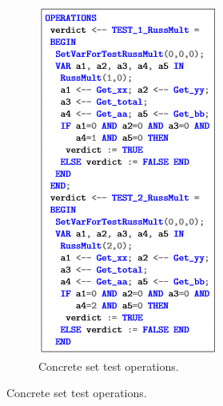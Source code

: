 \documentclass[runningheads]{llncs}
\begin{document}
\begin{figure}[ht]
\begin{minipage}{0.5\textwidth}
\begin{subfigure}{\textwidth}
\centering
\includegraphics[width = \textwidth]{imagens/concreteSetTest.png}
\caption{Concrete set test operations.}

\end{subfigure}
\end{minipage}
\end{figure}
\end{document}
